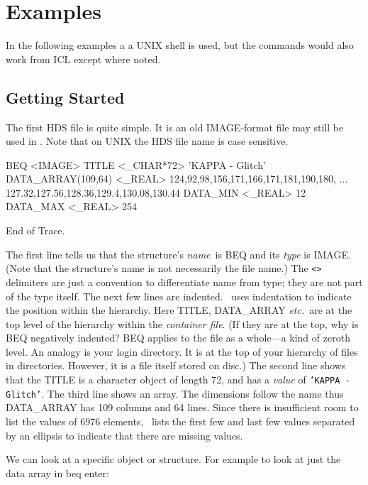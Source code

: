 \documentclass[11pt,nolof]{starlink}
\begin{document}
\section{Examples}
\label{se:example}
In the following examples a a UNIX shell is used, but the commands would
also work from ICL except where noted.

\subsection{Getting Started}
The first HDS file is quite simple.  It is an old IMAGE-format file may
still be used in \KAPPA.  Note that on UNIX the HDS file name is case sensitive.

\small
\begin{terminalv}

BEQ  <IMAGE>
  TITLE          <_CHAR*72>      'KAPPA - Glitch'
  DATA_ARRAY(109,64)  <_REAL>    124,92,98,156,171,166,171,181,190,180,
                                 ... 127.32,127.56,128.36,129.4,130.08,130.44
  DATA_MIN       <_REAL>         12
  DATA_MAX       <_REAL>         254

End of Trace.
\end{terminalv}
\normalsize
The first line tells us that the structure's \emph{name}\ is BEQ and its
\emph{type\/} is IMAGE.  (Note that the structure's name is not
necessarily the file name.)  The \texttt{<>} delimiters are just a
convention to differentiate name from type; they are not part of the
type itself.  The next few lines are indented.  \HDSTRACE\
uses indentation to indicate the position within the hierarchy.  Here
TITLE, DATA\_ARRAY \emph{etc.}\ are at the top level of the hierarchy
within the \emph{container file}.  (If they are at the top, why is BEQ
negatively indented?  BEQ applies to the file as a whole---a kind of
zeroth level. An analogy is your login directory.  It is at the top of
your hierarchy of files in directories.  However, it is a file itself
stored on disc.) The second line shows that the TITLE is a character
object of length 72, and has a \emph{value\/} of \texttt{'KAPPA - Glitch'}.
The third line shows an array.  The dimensions follow the name thus
DATA\_ARRAY has 109 columns and 64 lines.  Since there is insufficient
room to list the values of 6976 elements, \HDSTRACE\ lists
the first few and last few values separated by an ellipsis to indicate
that there are missing values.

We can look at a specific object or structure.  For example to look
at just the data array in beq enter:
\end{document}
